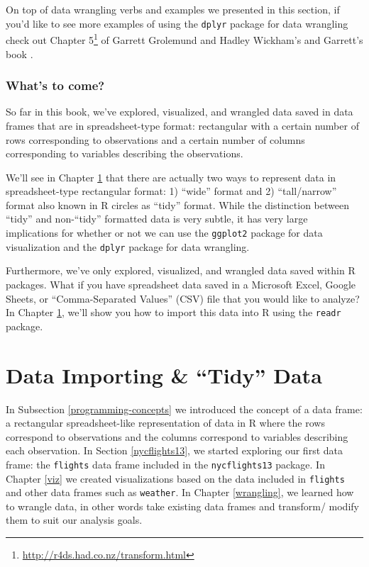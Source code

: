 \documentclass[12pt, krantz2,]{krantz}
\renewcommand{\href}[2]{#2\footnote{\url{#1}}}
\begin{document}
On top of data wrangling verbs and examples we presented in this section, if you'd like to see more examples of using the \texttt{dplyr} package for data wrangling check out \href{http://r4ds.had.co.nz/transform.html}{Chapter 5} of Garrett Grolemund and Hadley Wickham's and Garrett's book \citep{rds2016}.

\hypertarget{whats-to-come-1}{%
\subsection{What's to come?}\label{whats-to-come-1}}

So far in this book, we've explored, visualized, and wrangled data saved in data frames that are in spreadsheet-type format: rectangular with a certain number of rows corresponding to observations and a certain number of columns corresponding to variables describing the observations.

We'll see in Chapter \ref{tidy} that there are actually two ways to represent data in spreadsheet-type rectangular format: 1) ``wide'' format and 2) ``tall/narrow'' format also known in R circles as ``tidy'' format. While the distinction between ``tidy'' and non-``tidy'' formatted data is very subtle, it has very large implications for whether or not we can use the \texttt{ggplot2} package for data visualization and the \texttt{dplyr} package for data wrangling.

Furthermore, we've only explored, visualized, and wrangled data saved within R packages. What if you have spreadsheet data saved in a Microsoft Excel, Google Sheets, or ``Comma-Separated Values'' (CSV) file that you would like to analyze? In Chapter \ref{tidy}, we'll show you how to import this data into R using the \texttt{readr} package.

\hypertarget{tidy}{%
\chapter{Data Importing \& ``Tidy'' Data}\label{tidy}}

In Subsection \ref{programming-concepts} we introduced the concept of a data frame: a rectangular spreadsheet-like representation of data in R where the rows correspond to observations and the columns correspond to variables describing each observation. In Section \ref{nycflights13}, we started exploring our first data frame: the \texttt{flights} data frame included in the \texttt{nycflights13} package. In Chapter \ref{viz} we created visualizations based on the data included in \texttt{flights} and other data frames such as \texttt{weather}. In Chapter \ref{wrangling}, we learned how to wrangle data, in other words take existing data frames and transform/ modify them to suit our analysis goals.
\end{document}
